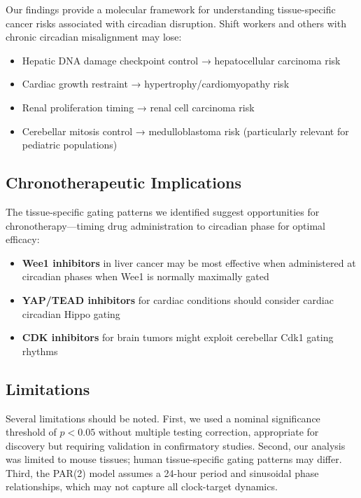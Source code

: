 \documentclass[10pt,letterpaper]{article}
\begin{document}
Our findings provide a molecular framework for understanding tissue-specific cancer risks associated with circadian disruption. Shift workers and others with chronic circadian misalignment may lose:

\begin{itemize}
    \item Hepatic DNA damage checkpoint control → hepatocellular carcinoma risk
    \item Cardiac growth restraint → hypertrophy/cardiomyopathy risk
    \item Renal proliferation timing → renal cell carcinoma risk
    \item Cerebellar mitosis control → medulloblastoma risk (particularly relevant for pediatric populations)
\end{itemize}

\subsection{Chronotherapeutic Implications}

The tissue-specific gating patterns we identified suggest opportunities for chronotherapy—timing drug administration to circadian phase for optimal efficacy:

\begin{itemize}
    \item \textbf{Wee1 inhibitors} in liver cancer may be most effective when administered at circadian phases when Wee1 is normally maximally gated
    \item \textbf{YAP/TEAD inhibitors} for cardiac conditions should consider cardiac circadian Hippo gating
    \item \textbf{CDK inhibitors} for brain tumors might exploit cerebellar Cdk1 gating rhythms
\end{itemize}

\subsection{Limitations}

Several limitations should be noted. First, we used a nominal significance threshold of $p < 0.05$ without multiple testing correction, appropriate for discovery but requiring validation in confirmatory studies. Second, our analysis was limited to mouse tissues; human tissue-specific gating patterns may differ. Third, the PAR(2) model assumes a 24-hour period and sinusoidal phase relationships, which may not capture all clock-target dynamics.
\end{document}
